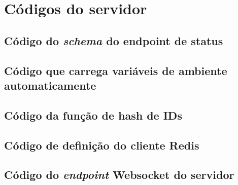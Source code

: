 \section{Códigos do servidor}\label{ch:codigos-servidor}

\subsection{Código do \textit{schema} do endpoint de
status}\label{schema:codigo-schema-status}


\subsection{Código que carrega variáveis de ambiente
automaticamente}\label{schema:codigo-load-env}


\subsection{Código da função de hash de \acsp{ID}}\label{hash:codigo-hash-id}


\subsection{Código de definição do cliente
Redis}\label{redis:codigo-redis-client}


\subsection{Código do \textit{endpoint} Websocket do
servidor}\label{ws:codigo-websocket}

